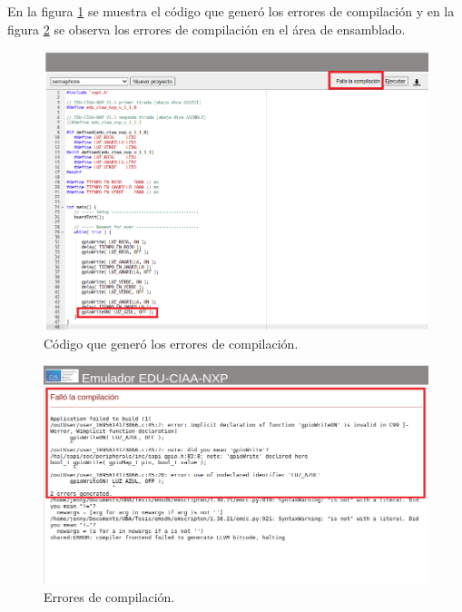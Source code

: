 En la figura \ref{fig:PlataformaErrores2} se muestra el código que generó los errores de compilación y en la figura \ref{fig:PlataformaErrores1} se observa los errores de compilación en el área de ensamblado.



\begin{figure}[ht]
	\centering
	\includegraphics[scale=.42]{./Figures/PlataformaErrores1.png}
	\caption{Código que generó los errores de compilación.}
	\label{fig:PlataformaErrores2}
\end{figure}

\hfill \break
\hfill \break
\hfill \break

\begin{figure}[ht]
	\centering
	\includegraphics[scale=.39]{./Figures/PlataformaErrores2.png}
	\caption{Errores de compilación.}
	\label{fig:PlataformaErrores1}
\end{figure}

